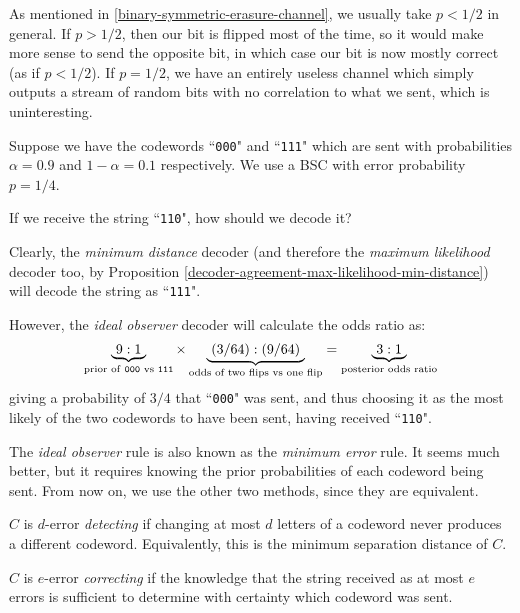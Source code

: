 \documentclass{article}
\begin{document}
\begin{note}
	As mentioned in \ref{binary-symmetric-erasure-channel}, we usually take $p < 1/2$ in general. If $p > 1/2$, then our bit is flipped most of the time, so it would make more sense to send the opposite bit, in which case our bit is now mostly correct (as if $p < 1/2$). If $p = 1/2$, we have an entirely useless channel which simply outputs a stream of random bits with no correlation to what we sent, which is uninteresting.
\end{note}

\begin{example}
    Suppose we have the codewords ``\texttt{000}" and ``\texttt{111}" which are  sent with probabilities $\alpha = 0.9$ and $1-\alpha = 0.1$ respectively. We use a BSC with error probability $p = 1/4$.
    
    If we receive the string ``\texttt{110}", how should we decode it?
    
    Clearly, the \textit{minimum distance} decoder (and therefore the \textit{maximum likelihood} decoder too, by Proposition \ref{decoder-agreement-max-likelihood-min-distance}) will decode the string as ``\texttt{111}".
    
    However, the \textit{ideal observer} decoder will calculate the odds ratio as:
    \[
	\underbrace{\ 9:1 \ }_{\text{prior of \texttt{000} vs \texttt{111}}} \times \underbrace{\ (3/64) : (9/64) \ }_{\text{odds of two flips vs one flip}} = \underbrace{\ 3 : 1 \ }_{\text{posterior odds ratio}}
	\]
	giving a probability of $3/4$ that ``\texttt{000}" was sent, and thus choosing it as the most likely of the two codewords to have been sent, having received ``\texttt{110}".
\end{example}

\begin{note}
	The \textit{ideal observer} rule is also known as the \textit{minimum error} rule. It seems much better, but it requires knowing the prior probabilities of each codeword being sent. From now on, we use the other two methods, since they are equivalent.
\end{note}

\begin{definition}
	\label{error-detecting-correcting}
	$C$ is $d$-error \textit{detecting} if changing at most $d$ letters of a codeword never produces a different codeword. Equivalently, this is the minimum separation distance of $C$.
	
	$C$ is $e$-error \textit{correcting} if the knowledge that the string received as at most $e$ errors is sufficient to determine with certainty which codeword was sent.
\end{definition}
\end{document}
